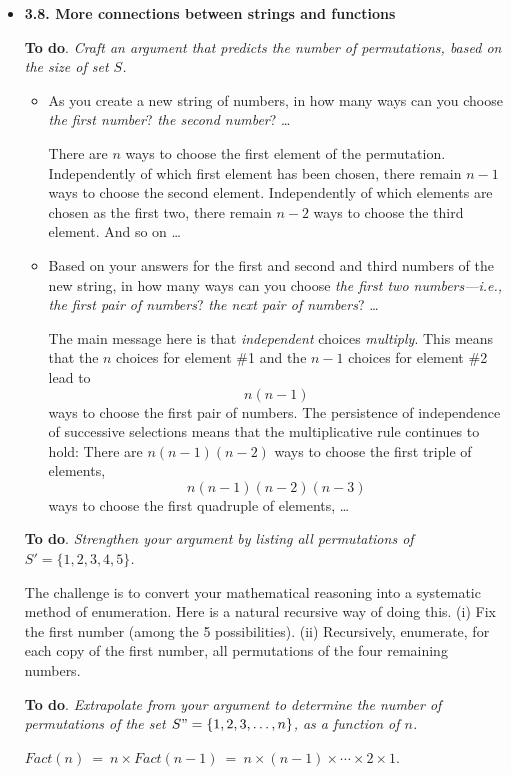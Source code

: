 


\begin{itemize}
\item
{\bf 3.8. More connections between strings and functions}
\medskip

{\bf To do}.  {\em Craft an argument that predicts the number of permutations, based on the size of set $S$.}
\smallskip

  \begin{itemize}
  \item
As you create a new string of numbers, in how many ways can you choose {\em the first number}? {\em the second number}? \ldots

\smallskip

There are $n$ ways to choose the first element of the permutation.  Independently of which first element has been chosen, there remain $n-1$ ways to choose the second element. Independently of which elements are chosen as the first two, there remain $n-2$ ways to choose the third element.  And so on \ldots

  \medskip\item
Based on your answers for the first and second and third numbers of the new string, in how many ways can you choose {\em the first two numbers---i.e., the first {\em pair} of numbers}?  {\em the next pair of numbers}? \ldots

\smallskip

The main message here is that {\em independent} choices {\em multiply}.  This means that the $n$ choices for element \#1 and the $n-1$ choices for element \#2 lead to
\[ n(n-1) \]
ways to choose the first pair of numbers.  The persistence of independence of successive selections means that the multiplicative rule continues to hold: There are $n(n-1)(n-2)$ ways to choose the first triple of elements,
\[ n(n-1)(n-2)(n-3) \]
ways to choose the first quadruple of elements, \ldots
  \end{itemize}

{\bf To do}. {\em Strengthen your argument by listing all permutations of  $S' =  \{1,2,3,4,5\}$.}

\smallskip

The challenge is to convert your mathematical reasoning into a systematic method of
enumeration.  Here is a natural recursive way of doing this. (i) Fix the first number (among the 5 possibilities).  (ii) Recursively, enumerate, for each copy of the first number, all permutations of the four remaining numbers.

\smallskip

{\bf To do}. {\em Extrapolate from your argument to determine the number of permutations of the set $S" =  \{1,2,3, \ldots, n\}$, as a function of $n$.}

\smallskip

$Fact(n) \ = \ n \times Fact(n-1) \ = \ n \times (n-1) \times \cdots \times 2 \times 1$.

\end{itemize}


